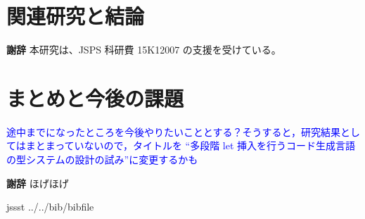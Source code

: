 \documentclass[T]{compsoft}
\newcommand\blue[1]{\textcolor{blue}{#1}}
\newcommand\ooi[1]{\blue{{#1}}}
\theoremstyle{break}
\begin{document}
\section{関連研究と結論}

{\bf 謝辞} 本研究は、JSPS 科研費 15K12007 の支援を受けている。

\section{まとめと今後の課題}
\ooi{途中までになったところを今後やりたいこととする？そうすると，研究結果としてはまとまっていないので，タイトルを ``多段階 let 挿入を行うコード生成言語の型システムの設計の試み''に変更するかも}

{\bf 謝辞}
ほげほげ

 {jssst}
 {../../bib/bibfile}
\end{document}
